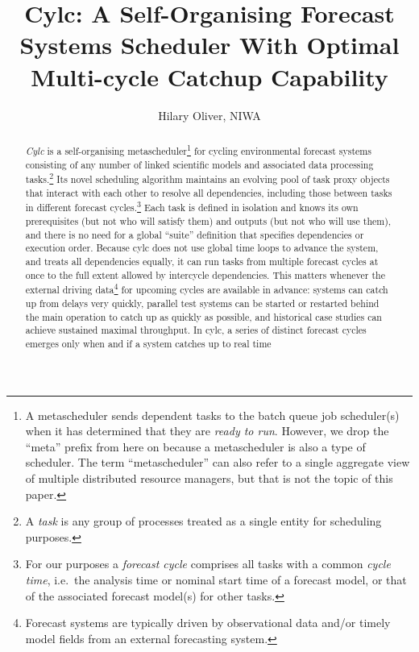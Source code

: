 \documentclass[11pt,a4paper]{article}
\title{Cylc: A Self-Organising Forecast Systems Scheduler With Optimal
Multi-cycle Catchup Capability}
\author{Hilary Oliver, NIWA}
\begin{document}
\maketitle

\pagebreak
\tableofcontents
\pagebreak

\begin{abstract}

    {\em Cylc} is a self-organising metascheduler\footnote{A
    metascheduler sends dependent tasks to the batch queue job
    scheduler(s) when it has determined that they are {\em ready to
    run}. However, we drop the ``meta'' prefix from here on because a
    metascheduler is also a type of scheduler. The term
    ``metascheduler'' can also refer to a single aggregate view of
    multiple distributed resource managers, but that is not the topic of
    this paper.} for cycling environmental forecast systems consisting
    of any number of linked scientific models and associated data
    processing tasks.\footnote{A {\em task} is any group of processes
    treated as a single entity for scheduling purposes.} Its novel
    scheduling algorithm maintains an evolving pool of task proxy
    objects that interact with each other to resolve all dependencies,
    including those between tasks in different forecast
    cycles.\footnote{For our purposes a {\em forecast cycle} comprises
    all tasks with a common {\em cycle time}, i.e.\ the analysis time or
    nominal start time of a forecast model, or that of the associated
    forecast model(s) for other tasks.} Each task is defined in
    isolation and knows its own prerequisites (but not who will satisfy
    them) and outputs (but not who will use them), and there is no need
    for a global ``suite'' definition that specifies dependencies or
    execution order. Because cylc does not use global time loops to
    advance the system, and treats all dependencies equally, it can run
    tasks from multiple forecast cycles at once to the full extent
    allowed by intercycle dependencies. This matters whenever the
    external driving data\footnote{Forecast systems are typically driven
    by observational data and/or timely model fields from an external
    forecasting system.} for upcoming cycles are available in advance:
    systems can catch up from delays very quickly, parallel test systems
    can be started or restarted behind the main operation to catch up as
    quickly as possible, and historical case studies can achieve
    sustained maximal throughput. In cylc, a series of distinct forecast
    cycles emerges only when and if a system catches up to real time

\end{abstract}
\end{document}
